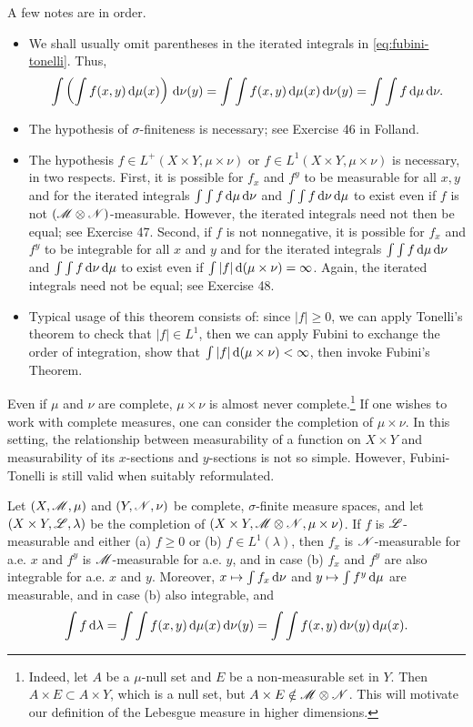 \documentclass[12pt]{article} %
\begin{document}
\begin{remark}
    A few notes are in order.\begin{itemize}
        \item We shall usually omit parentheses in the iterated integrals in \cref{eq:fubini-tonelli}. Thus, \[\int \left( \int f(x, y) \, \mathrm{d} \mu(x) \right) \, \mathrm{d} \nu(y) = \int \int f(x, y) \, \mathrm{d} \mu(x) \, \mathrm{d} \nu(y) = \int \int f \, \mathrm{d}\mu \, \mathrm{d} \nu.\]
        \item The hypothesis of $\sigma$-finiteness is necessary; see Exercise 46 in Folland.
        \item The hypothesis $f \in L^+(X \times Y, \mu \times \nu)$ or $f \in L^1(X \times Y, \mu \times \nu)$ is necessary, in two respects. First, it is possible for $f_x$ and $f^y$ to be measurable for all $x, y$ and for the iterated integrals $\int \int f \, \mathrm{d} \mu\, \mathrm{d} \nu$ and $\int \int f \, \mathrm{d}\nu\, \mathrm{d}\mu$ to exist even if $f$ is not $(\mathscr{M} \otimes \mathscr{N})$-measurable. However, the iterated integrals need not then be equal; see Exercise 47. Second, if $f$ is not nonnegative, it is possible for $f_x$ and $f^y$ to be integrable for all $x$ and $y$ and for the iterated integrals $\int \int f \, \mathrm{d}\mu\, \mathrm{d}\nu$ and $\int \int f \, \mathrm{d}\nu\, \mathrm{d}\mu$ to exist even if $\int |f| \, \mathrm{d}(\mu \times \nu) = \infty$. Again, the iterated integrals need not be equal; see Exercise 48.
        \item  Typical usage of this theorem consists of: since $|f| \geq 0$, we can apply Tonelli's theorem to check that $|f| \in L^1$, then we can apply Fubini to exchange the order of integration, show that $\int |f| \, \mathrm{d}(\mu \times \nu) < \infty$, then invoke Fubini's Theorem.
    \end{itemize}
\end{remark}

Even if $\mu$ and $\nu$ are complete, $\mu \times \nu$ is almost never complete.\footnote{Indeed, let $A$ be a $\mu$-null set and $E$ be a non-measurable set in $Y$. Then $A \times E \subset A \times Y$, which is a null set, but $A \times E \notin \mathscr{M} \otimes \mathscr{N}$. This will motivate our definition of the Lebesgue measure in higher dimensions.} If one wishes to work with complete measures, one can consider the completion of $\mu \times \nu$. In this setting, the relationship between measurability of a function on $X \times Y$ and measurability of its $x$-sections and $y$-sections is not so simple. However, Fubini-Tonelli is still valid when suitably reformulated.

\begin{theorem}
    Let $(X, \mathscr{M}, \mu)$ and $(Y, \mathscr{N}, \nu)$ be complete, $\sigma$-finite measure spaces, and let $(X \times Y, \mathscr{L}, \lambda)$ be the completion of $(X \times Y, \mathscr{M} \otimes \mathscr{N}, \mu \times \nu)$. If $f$ is $\mathscr{L}$-measurable and either (a) $f \geq 0$ or (b) $f \in L^1(\lambda)$, then $f_x$ is $\mathscr{N}$-measurable for a.e. $x$ and $f^y$ is $\mathscr{M}$-measurable for a.e. $y$, and in case (b) $f_x$ and $f^y$ are also integrable for a.e. $x$ and $y$. Moreover, $x \mapsto \int f_x \, \mathrm{d} \nu$ and $y \mapsto \int f^y \, \mathrm{d} \mu$ are measurable, and in case (b) also integrable, and \[\int f \, \mathrm{d} \lambda = \int \int f(x, y) \, \mathrm{d} \mu(x) \, \mathrm{d} \nu(y) = \int \int f(x, y) \, \mathrm{d} \nu(y) \, \mathrm{d} \mu(x).\]
\end{theorem}
\end{document}
